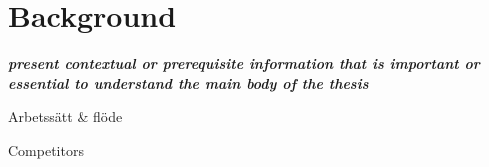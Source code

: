 \section{Background}
\textbf{\textit{present contextual or prerequisite information that is important or essential to understand the main body of the thesis}}

Arbetssätt \& flöde

Competitors
